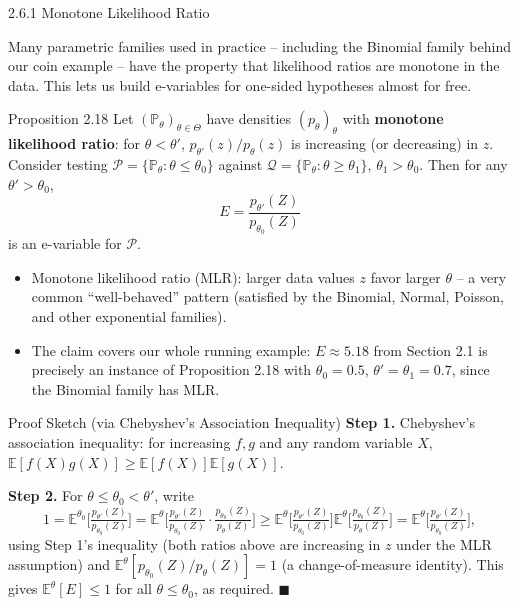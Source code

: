 \documentclass[aspectratio=169,10pt]{beamer}
\newcommand{\PP}{\mathbb{P}}
\newcommand{\EE}{\mathbb{E}}
\newcommand{\calP}{\mathcal{P}}
\newcommand{\calQ}{\mathcal{Q}}
\begin{document}
\begin{frame}[allowframebreaks]{2.6.1 Monotone Likelihood Ratio}

Many parametric families used in practice -- including the Binomial family
behind our coin example -- have the property that likelihood ratios are
monotone in the data. This lets us build e-variables for one-sided
hypotheses almost for free.

  \begin{block}{Proposition 2.18}
    Let $(\PP_\theta)_{\theta\in\Theta}$ have densities $(p_\theta)_{\theta}$
    with \textbf{monotone likelihood ratio}: for $\theta<\theta'$,
    $p_{\theta'}(z)/p_\theta(z)$ is increasing (or decreasing) in $z$.
    Consider testing $\calP=\{\PP_\theta:\theta\le\theta_0\}$ against
    $\calQ = \{\PP_\theta:\theta\ge\theta_1\}$, $\theta_1>\theta_0$. Then for
    any $\theta'>\theta_0$,
    \[
      E = \frac{p_{\theta'}(Z)}{p_{\theta_0}(Z)}
    \]
    is an e-variable for $\calP$.
  \end{block}

  \begin{itemize}
    \item Monotone likelihood ratio (MLR): larger data values $z$ favor
      larger $\theta$ -- a very common ``well-behaved'' pattern (satisfied
      by the Binomial, Normal, Poisson, and other exponential families).
    \item The claim covers our whole running example: $E\approx5.18$ from
      Section 2.1 is precisely an instance of Proposition 2.18 with
      $\theta_0=0.5$, $\theta'=\theta_1=0.7$, since the Binomial family has MLR.
    \end{itemize}

  \begin{block}{Proof Sketch (via Chebyshev's Association Inequality)}
    \textbf{Step 1.} Chebyshev's association inequality: for increasing
    $f,g$ and any random variable $X$,
    $\EE[f(X)g(X)] \ge \EE[f(X)]\EE[g(X)]$.

    \medskip
    \textbf{Step 2.} For $\theta\le\theta_0<\theta'$, write
    \[
      1 = \EE^{\theta_0}\!\Big[\tfrac{p_{\theta'}(Z)}{p_{\theta_0}(Z)}\Big]
        = \EE^{\theta}\!\Big[\tfrac{p_{\theta'}(Z)}{p_{\theta_0}(Z)}\cdot
                              \tfrac{p_{\theta_0}(Z)}{p_{\theta}(Z)}\Big]
        \ge \EE^{\theta}\!\Big[\tfrac{p_{\theta'}(Z)}{p_{\theta_0}(Z)}\Big]
            \EE^{\theta}\!\Big[\tfrac{p_{\theta_0}(Z)}{p_{\theta}(Z)}\Big]
        = \EE^{\theta}\!\Big[\tfrac{p_{\theta'}(Z)}{p_{\theta_0}(Z)}\Big],
    \]
    using Step 1's inequality (both ratios above are increasing in $z$
    under the MLR assumption) and $\EE^\theta[p_{\theta_0}(Z)/p_\theta(Z)]=1$
    (a change-of-measure identity). This gives $\EE^\theta[E]\le1$ for all
    $\theta\le\theta_0$, as required. $\blacksquare$
  \end{block}


\end{frame}
\end{document}
